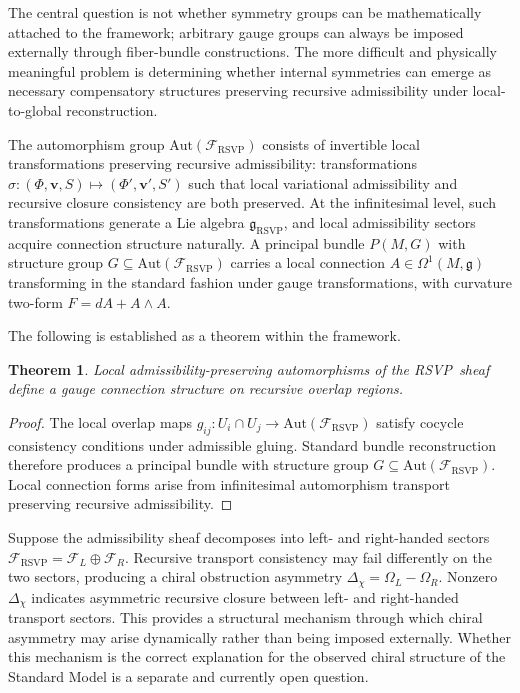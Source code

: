 \documentclass[12pt,a4paper]{article}
\newtheorem{theorem}[definition]{Theorem}
\newcommand{\RSVP}{\textrm{RSVP}}
\newcommand{\Sheaf}{\mathcal{F}}
\begin{document}
The central question is not whether symmetry groups can be mathematically
attached to the framework; arbitrary gauge groups can always be imposed
externally through fiber-bundle constructions. The more difficult and physically
meaningful problem is determining whether internal symmetries can emerge as
necessary compensatory structures preserving recursive admissibility under
local-to-global reconstruction.

The automorphism group $\mathrm{Aut}(\Sheaf_\RSVP)$ consists of invertible
local transformations preserving recursive admissibility: transformations
$\sigma:(\Phi,\mathbf{v},S)\mapsto(\Phi',\mathbf{v}',S')$ such that local
variational admissibility and recursive closure consistency are both preserved.
At the infinitesimal level, such transformations generate a Lie algebra
$\mathfrak{g}_\RSVP$, and local admissibility sectors acquire connection
structure naturally. A principal bundle $P(M,G)$ with structure group
$G\subseteq\mathrm{Aut}(\Sheaf_\RSVP)$ carries a local connection
$A\in\Omega^1(M,\mathfrak{g})$ transforming in the standard fashion under
gauge transformations, with curvature two-form $F=dA+A\wedge A$.

The following is established as a theorem within the framework.

\begin{theorem}
Local admissibility-preserving automorphisms of the \RSVP\ sheaf define a gauge
connection structure on recursive overlap regions.
\end{theorem}

\begin{proof}
The local overlap maps $g_{ij}:U_i\cap U_j\to\mathrm{Aut}(\Sheaf_\RSVP)$
satisfy cocycle consistency conditions under admissible gluing. Standard bundle
reconstruction therefore produces a principal bundle with structure group
$G\subseteq\mathrm{Aut}(\Sheaf_\RSVP)$. Local connection forms arise from
infinitesimal automorphism transport preserving recursive admissibility.
\end{proof}

Suppose the admissibility sheaf decomposes into left- and right-handed sectors
$\Sheaf_\RSVP=\Sheaf_L\oplus\Sheaf_R$. Recursive transport consistency may
fail differently on the two sectors, producing a chiral obstruction asymmetry
$\Delta_\chi=\Omega_L-\Omega_R$. Nonzero $\Delta_\chi$ indicates asymmetric
recursive closure between left- and right-handed transport sectors. This
provides a structural mechanism through which chiral asymmetry may arise
dynamically rather than being imposed externally. Whether this mechanism is
the correct explanation for the observed chiral structure of the Standard Model
is a separate and currently open question.
\end{document}
